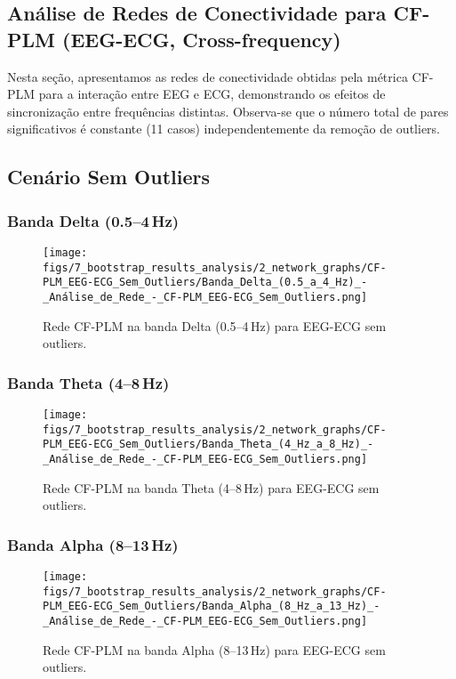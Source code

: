 \begin{apendicesenv}
    \chapter{Análise de Redes de Conectividade para CF-PLM (EEG-ECG, Cross-frequency)}
    \label{apendice:cfplm_eeg_ecg}
    Nesta seção, apresentamos as redes de conectividade obtidas pela métrica CF-PLM para a interação entre EEG e ECG, demonstrando os efeitos de sincronização entre frequências distintas. Observa-se que o número total de pares significativos é constante (11 casos) independentemente da remoção de outliers.
    
    \section{Cenário Sem Outliers}
    
    \subsection{Banda Delta (0.5--4\,Hz)}
    \begin{figure}[H]
      \centering
      \texttt{[image: figs/7\_bootstrap\_results\_analysis/2\_network\_graphs/CF-PLM\_EEG-ECG\_Sem\_Outliers/Banda\_Delta\_(0.5\_a\_4\_Hz)\_-\_Análise\_de\_Rede\_-\_CF-PLM\_EEG-ECG\_Sem\_Outliers.png]}
      \caption{Rede CF-PLM na banda Delta (0.5--4\,Hz) para EEG-ECG sem outliers.}
      \label{fig:apend_cfplm_delta_sem}
    \end{figure}
    
    \subsection{Banda Theta (4--8\,Hz)}
    \begin{figure}[H]
      \centering
      \texttt{[image: figs/7\_bootstrap\_results\_analysis/2\_network\_graphs/CF-PLM\_EEG-ECG\_Sem\_Outliers/Banda\_Theta\_(4\_Hz\_a\_8\_Hz)\_-\_Análise\_de\_Rede\_-\_CF-PLM\_EEG-ECG\_Sem\_Outliers.png]}
      \caption{Rede CF-PLM na banda Theta (4--8\,Hz) para EEG-ECG sem outliers.}
      \label{fig:apend_cfplm_theta_sem}
    \end{figure}
    
    \subsection{Banda Alpha (8--13\,Hz)}
    \begin{figure}[H]
      \centering
      \texttt{[image: figs/7\_bootstrap\_results\_analysis/2\_network\_graphs/CF-PLM\_EEG-ECG\_Sem\_Outliers/Banda\_Alpha\_(8\_Hz\_a\_13\_Hz)\_-\_Análise\_de\_Rede\_-\_CF-PLM\_EEG-ECG\_Sem\_Outliers.png]}
      \caption{Rede CF-PLM na banda Alpha (8--13\,Hz) para EEG-ECG sem outliers.}
      \label{fig:apend_cfplm_alpha_sem}
    \end{figure}
    

\end{apendicesenv}
